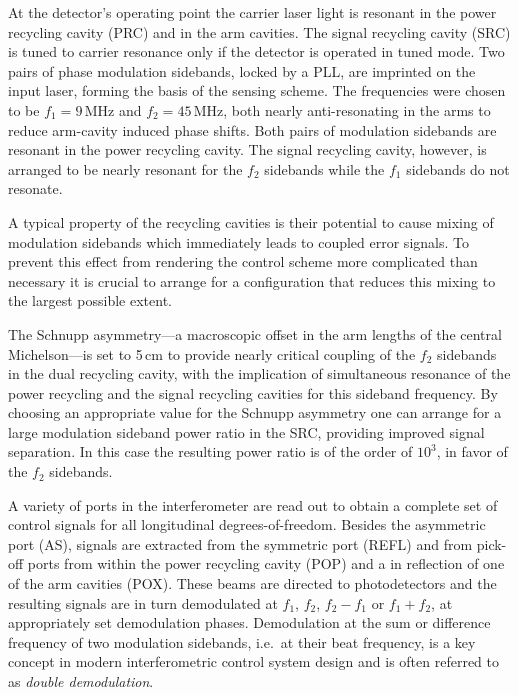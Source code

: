 At the detector's operating point the carrier laser light is resonant in the power recycling cavity (PRC) and in the arm cavities. The signal recycling cavity (SRC)
is tuned to carrier resonance only if the detector is operated in tuned mode. 
Two pairs of phase modulation sidebands, locked by a PLL, are imprinted on the input laser, forming the basis of the sensing scheme. 
The frequencies were chosen to be $f_1=9$\,MHz and $f_2=45$\,MHz, both nearly anti-resonating in the arms to reduce arm-cavity induced phase shifts.%
Both pairs of modulation sidebands are resonant in the power recycling cavity. The signal recycling cavity, however, is arranged to be nearly resonant for the $f_2$ sidebands 
while the $f_1$ sidebands do not resonate.

A typical property of the recycling cavities is their potential to cause mixing of modulation sidebands which immediately leads to 
coupled error signals. To prevent this effect from rendering the control scheme more complicated than necessary it is crucial to 
arrange for a configuration that reduces this mixing to the largest possible extent. 

The Schnupp asymmetry---a macroscopic offset in the arm lengths of the central Michelson---is set to 5\,cm to provide nearly critical coupling of the $f_2$ 
sidebands in the dual recycling cavity, with the implication of simultaneous resonance of the power recycling and the signal recycling cavities 
for this sideband frequency. By choosing an appropriate value for the Schnupp asymmetry one can arrange for a large modulation sideband power ratio in the SRC, 
providing improved signal separation. In this case the resulting power ratio is of the order of $10^3$, in favor of the $f_2$ sidebands.

A variety of ports in the interferometer are read out to obtain a complete set of control signals for all longitudinal degrees-of-freedom. 
Besides the asymmetric port (AS), signals are extracted from the symmetric port (REFL) and from pick-off ports from within the power recycling cavity (POP)
and a in reflection of one of the arm cavities (POX). These beams are directed to photodetectors and the resulting signals are in 
turn demodulated at $f_1$, $f_2$, $f_2-f_1$ or $f_1+f_2$, at appropriately set demodulation phases. 
Demodulation at the sum or difference frequency of two modulation sidebands, i.e.\ at their beat frequency, is a key concept in modern interferometric control system design and is 
often referred to as \emph{double demodulation}.

